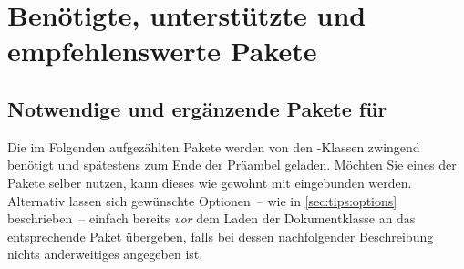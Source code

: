 \chapter{%
  Benötigte, unterstützte und empfehlenswerte Pakete%
  \label{sec:packages}%
}
\section{%
  Notwendige und ergänzende Pakete für \TUDScript%
  \label{sec:packages:needed}%
}

Die im Folgenden aufgezählten Pakete werden von den \TUDScript-Klassen zwingend 
benötigt und spätestens zum Ende der Präambel geladen. Möchten Sie eines der 
Pakete selber nutzen, kann dieses wie gewohnt mit
 eingebunden werden. 
Alternativ lassen sich gewünschte Optionen~-- wie in \autoref{sec:tips:options} 
beschrieben~-- einfach bereits \emph{vor} dem Laden der Dokumentklasse an das 
entsprechende Paket übergeben, falls bei dessen nachfolgender Beschreibung 
nichts anderweitiges angegeben ist.

